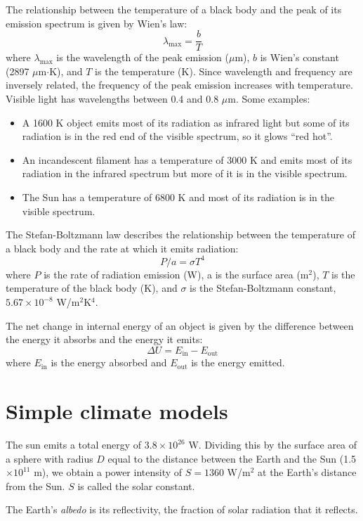 \documentclass[11pt]{article}
\begin{document}
The relationship between the temperature of a black body and the peak of its emission spectrum is
given by Wien's law:
\[
\lambda_{\text{max}} = \frac{b}{T}
\]
where $\lambda_{\text{max}}$ is the wavelength of the peak emission ($\mu$m), $b$ is Wien's constant (2897 $\mu$m$\cdot$K),
and $T$ is the temperature (K). Since wavelength and frequency are inversely related, the frequency of the peak emission
increases with temperature. Visible light has wavelengths between 0.4 and 0.8 $\mu$m.
Some examples:
\begin{itemize}
    \item A 1600 K object emits most of its radiation as infrared light but some of its radiation is in the red end of the visible spectrum,
        so it glows ``red hot''.
    \item An incandescent filament has a temperature of 3000 K and emits most of its radiation in the infrared spectrum but more of it is in the visible spectrum.
    \item The Sun has a temperature of 6800 K and most of its radiation is in the visible spectrum.
\end{itemize}

The Stefan-Boltzmann law describes the relationship between the temperature of a black body
and the rate at which it emits radiation:
\[
P/a = \sigma T^4
\]
where $P$ is the rate of radiation emission (W), a is the surface area (m$^2$), $T$ is the temperature of the black body (K),
and $\sigma$ is the Stefan-Boltzmann constant, $5.67 \times 10^{-8}$ W/m$^2$K$^4$.

The net change in internal energy of an object is given by the difference between the energy it absorbs and the energy it emits:
\[
\Delta U = E_{\text{in}} - E_{\text{out}}
\]
where $E_{\text{in}}$ is the energy absorbed and $E_{\text{out}}$ is the energy emitted.

\section{Simple climate models}

The sun emits a total energy of $3.8 \times 10^{26}$ W.
Dividing this by the surface area of a sphere with radius $D$ equal to the distance between the Earth and the Sun (1.5 $\times 10^{11}$ m),
we obtain a power intensity of $S = 1360$ W/m$^2$ at the Earth's distance from the Sun. $S$ is called the solar constant.

The Earth's {\em albedo} is its reflectivity, the fraction of solar radiation that it reflects.
\end{document}
